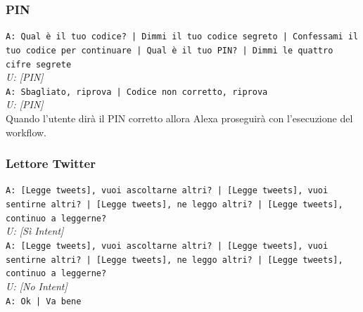 \subsubsection{PIN}
\texttt{A: Qual è il tuo codice? | Dimmi il tuo codice segreto | Confessami il tuo codice per continuare | Qual è il tuo PIN? | Dimmi le quattro cifre segrete}\\
\textit{U: [PIN]}\\
\texttt{A: Sbagliato, riprova | Codice non corretto, riprova}\\
\textit{U: [PIN]}\\
Quando l'utente dirà il PIN corretto allora Alexa proseguirà con l'esecuzione del workflow.

\subsubsection{Lettore Twitter}
\texttt{A: [Legge tweets], vuoi ascoltarne altri? | [Legge tweets], vuoi sentirne altri? | [Legge tweets], ne leggo altri? | [Legge tweets], continuo a leggerne?}\\
\textit{U: [Sì Intent]}\\
\texttt{A: [Legge tweets], vuoi ascoltarne altri? | [Legge tweets], vuoi sentirne altri? | [Legge tweets], ne leggo altri? | [Legge tweets], continuo a leggerne?}\\
\textit{U: [No Intent]}\\
\texttt{A: Ok | Va bene}

